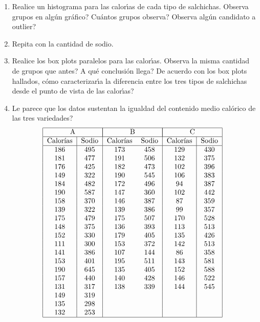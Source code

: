 \documentclass[11pt,a4paper,twoside]{article}%
\begin{document}
\begin{enumerate}
\begin{enumerate}
\item Realice un histograma para las calor\'{\i}as de cada tipo de salchichas.
\textquestiondown Observa grupos en alg\'{u}n gr\'{a}fico?
\textquestiondown Cu\'{a}ntos grupos observa? \textquestiondown Observa
alg\'{u}n candidato a outlier?

\item Repita con la cantidad de sodio.

\item Realice los box plots paralelos para las calor\'{\i}as.
\textquestiondown Observa la misma cantidad de grupos que antes?
\textquestiondown A qu\'{e} conclusi\'{o}n llega? De acuerdo con los box plots
hallados, \textquestiondown c\'{o}mo caracterizar\'{\i}a la diferencia entre
los tres tipos de salchichas desde el punto de vista de las calor\'{\i}as?

\item \textquestiondown Le parece que los datos sustentan la igualdad del
contenido medio cal\'{o}rico de las tres variedades?%
\[%
\begin{tabular}
[c]{|c|c|cc|c|c|}\hline
\multicolumn{2}{|c|}{A} & \multicolumn{2}{|c|}{B} & \multicolumn{2}{|c|}{C}%
\\\hline
Calor\'{\i}as & Sodio & Calor\'{\i}as & Sodio & Calor\'{\i}as & Sodio\\\hline
186 & 495 & 173 & 458 & 129 & 430\\
181 & 477 & 191 & 506 & 132 & 375\\
176 & 425 & 182 & 473 & 102 & 396\\
149 & 322 & 190 & 545 & 106 & 383\\
184 & 482 & 172 & 496 & 94 & 387\\
190 & 587 & 147 & 360 & 102 & 442\\
158 & 370 & 146 & 387 & 87 & 359\\
139 & 322 & 139 & 386 & 99 & 357\\
175 & 479 & 175 & 507 & 170 & 528\\
148 & 375 & 136 & 393 & 113 & 513\\
152 & 330 & 179 & 405 & 135 & 426\\
111 & 300 & 153 & 372 & 142 & 513\\
141 & 386 & 107 & 144 & 86 & 358\\
153 & 401 & 195 & 511 & 143 & 581\\
190 & 645 & 135 & 405 & 152 & 588\\
157 & 440 & 140 & 428 & 146 & 522\\
131 & 317 & 138 & 339 & 144 & 545\\
149 & 319 &  &  &  & \\
135 & 298 &  &  &  & \\
132 & 253 &  &  &  & \\\hline
\end{tabular}
\ \
\]


\end{enumerate}
\end{enumerate}
\end{document}
